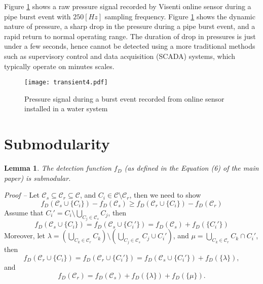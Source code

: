 \documentclass[twocolumn]{autart}
\newtheorem{lemma}[theorem]{\bf Lemma}
\begin{document}
Figure \ref{fig:2} shows a raw pressure signal recorded by Visenti \cite{visent} online sensor during a pipe burst event with $250 [Hz]$ sampling frequency. Figure \ref{fig:2} shows the dynamic nature of pressure, a sharp drop in the pressure during a pipe burst event, and a rapid return to normal operating range. The duration of drop in pressures is just under a few seconds, hence cannot be detected using a more traditional methods such as supervisory control and data acquisition (SCADA) systems, which typically operate on minutes scales.
\begin{figure}
        \centering
                \texttt{[image: transient4.pdf]}
       \caption{Pressure signal during a burst event recorded from online sensor installed in a water system}  \label{fig:2}
\end{figure}



\section{Submodularity} \label{app:A}
\begin{lemma}
\label{lem:submodular}
The detection function $f_D$ (as defined in the Equation (6) of the main paper) is submodular.
\end{lemma}
\textit{Proof -- }
Let $\mathcal{C}_s\subseteq \mathcal{C}_r\subseteq \mathcal{C}$, and $C_i\in\mathcal{C}\setminus \mathcal{C}_r$, then we need to show 
$$f_D\left(\mathcal{C}_s\cup\{C_i\}\right) - f_D(\mathcal{C}_s) \ge f_D\left(\mathcal{C}_r\cup\{C_i\}\right) - f_D(\mathcal{C}_r)$$
Assume that $C_i'=C_i\setminus\bigcup\limits_{C_j\in \mathcal{C}_s}C_j$, then
\begin{equation}
\label{eq:p1}
f_D(\mathcal{C}_s\cup\{C_i\}) = f_D(\mathcal{C}_s\cup\{C_i'\}) = f_D(\mathcal{C}_s) + f_D(\{C_i'\})
\end{equation}
Moreover, let $\lambda = \left(\bigcup\limits_{C_k\in \mathcal{C}_r}C_k\right)\setminus \left(\bigcup\limits_{C_j\in \mathcal{C}_s}C_j \cup C_i'\right)$, and $\mu = \bigcup\limits_{C_k\in \mathcal{C}_r}C_k\cap C_i'$, then
\begin{equation}
\label{eq:p2}
f_D(\mathcal{C}_r \cup\{C_i\}) = f_D(\mathcal{C}_r\cup\{C_i'\}) = f_D(\mathcal{C}_s\cup\{C_i'\}) + f_D(\{\lambda\}),
\end{equation}
and
\begin{equation}
\label{eq:p3}
f_D(\mathcal{C}_r) = f_D(\mathcal{C}_s) + f_D(\{\lambda\}) +f_D(\{\mu\}).
\end{equation}
\end{document}
